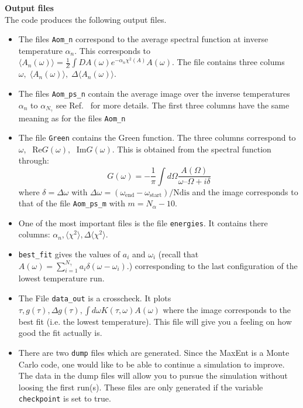 \noindent
\textbf{Output files} \\
The code produces  the following output files.
\begin{itemize}
\item The files  \texttt{Aom\_n}  correspond to the average spectral function at inverse  temperature  $ \alpha_n $. This corresponds to
$  \langle A_n(\omega) \rangle =   \frac{1}{Z}   \int DA(\omega)    e^{-\alpha_n \chi^{2}(A)  } A(\omega). $
The file contains three colums  $ \omega, \;  \langle A_n(\omega) \rangle , \;  \Delta \langle A_n(\omega) \rangle $.

\item The files \texttt{Aom\_ps\_n}   contain the average image over  the  inverse   temperatures  $ \alpha_n $ to $ \alpha_{N_\gamma} $  see Ref.~\cite{Beach04a} for more details.   
 The first three columns have the same meaning as for the files \texttt{Aom\_n}

\item The file \texttt{Green} contains the Green function. The three columns correspond to $ \omega, \;   \text{ Re} G(\omega), \;  \text{  Im} G(\omega)  $.  This is obtained from the spectral function through:
\begin{equation}
 G(\omega) =  -\frac{1}{\pi} \int d \Omega   \frac{A(\Omega)}{\omega – \Omega + i \delta}
 \end{equation}
where  $ \delta =  \Delta \omega$ with $ \Delta \omega = (\omega_\text{end} -  \omega_\text{start})/\text{Ndis}$ and the image corresponds to that of the file \texttt{Aom\_ps\_m} with $ m = N_{\alpha} -10 $.

\item  One of the most important files is the file  \texttt{energies}. It contains there columns:  $ \alpha_n, \langle \chi^2 \rangle, \Delta \langle \chi^2 \rangle $.

\item   \texttt{best\_fit}  gives the values of $a_i$ and $\omega_i$   (recall that $ A(\omega)  = \sum_{i=1}^{N_{\gamma}} a_{i} \delta \left( \omega - \omega_i \right).$) corresponding to the last configuration of the  lowest temperature run.

\item  The File \texttt{data\_out}  is a crosscheck. It plots   $ \tau,  g(\tau),  \Delta g(\tau), \int d \omega  K(\tau, \omega) A(\omega) $ where the image  corresponds to the best fit (i.e. the lowest temperature). 
This file will give you  a feeling on how good the fit actually is.


\item There are two \texttt{dump} files which are generated. Since  the MaxEnt is a  Monte Carlo code, one  would like to be able to continue a simulation to improve. The data in the dump files will allow you to pursue the simulation without loosing the first run(s).   These files are  only generated if the variable  \texttt{checkpoint} is set to true. 
 \end{itemize}


